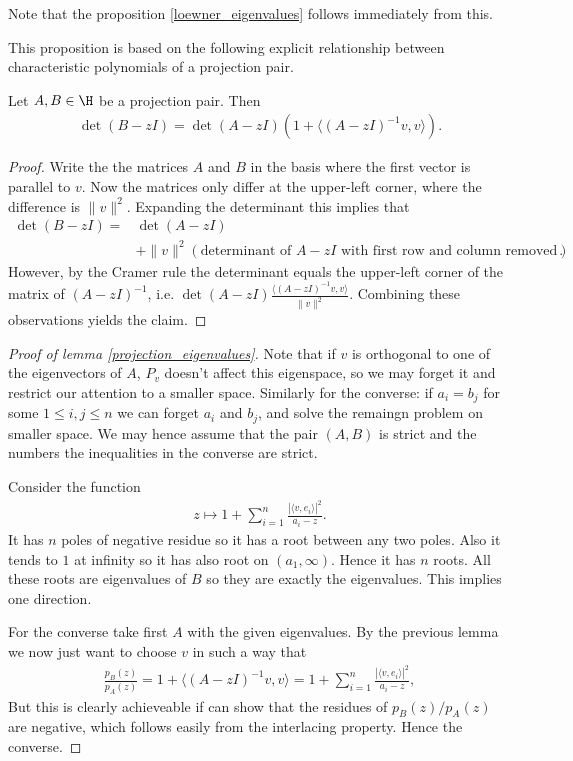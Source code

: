 Note that the proposition \ref{loewner_eigenvalues} follows immediately from this.

This proposition is based on the following explicit relationship between characteristic polynomials of a projection pair.

\begin{lem}\label{projection_characteristic_polynomial}
	Let $A, B \in \H$ be a projection pair. Then
	\begin{align*}
		\det(B - z I) = \det(A - z I) \left(1 + \langle (A - z I)^{-1}v, v\rangle\right).
	\end{align*}
\end{lem}
\begin{proof}
	Write the the matrices $A$ and $B$ in the basis where the first vector is parallel to $v$. Now the matrices only differ at the upper-left corner, where the difference is $\|v\|^2$. Expanding the determinant this implies that
	\begin{align*}
		\det(B - z I) =& \det(A - z I) \\
		&+ \|v\|^2 \left(\text{determinant of $A - zI$ with first row and column removed} \right).
	\end{align*}
	However, by the Cramer rule the determinant equals the upper-left corner of the matrix of $(A - z I)^{-1}$, i.e. $\det(A - z I)\frac{\langle (A - zI)^{-1} v, v \rangle}{\|v\|^2}$. Combining these observations yields the claim.
\end{proof}


\begin{proof}[Proof of lemma \ref{projection_eigenvalues}]
	Note that if $v$ is orthogonal to one of the eigenvectors of $A$, $P_{v}$ doesn't affect this eigenspace, so we may forget it and restrict our attention to a smaller space. Similarly for the converse: if $a_{i} = b_{j}$ for some $1 \leq i, j \leq n$ we can forget $a_{i}$ and $b_{j}$, and solve the remaingn problem on smaller space. We may hence assume that the pair $(A, B)$ is strict and the numbers the inequalities in the converse are strict.

	Consider the function
	\begin{align*}
		z \mapsto 1 + \sum_{i = 1}^{n} \frac{|\langle v, e_{i} \rangle|^2}{a_{i} - z}.
	\end{align*}
	It has $n$ poles of negative residue so it has a root between any two poles. Also it tends to $1$ at infinity so it has also root on $(a_{1}, \infty)$. Hence it has $n$ roots. All these roots are eigenvalues of $B$ so they are exactly the eigenvalues. This implies one direction.

	For the converse take first $A$ with the given eigenvalues. By the previous lemma we now just want to choose $v$ in such a way that
	\begin{align*}
		\frac{p_{B}(z)}{p_{A}(z)} = 1 + \langle (A - z I)^{-1}v, v\rangle= 1 + \sum_{i = 1}^{n} \frac{|\langle v, e_{i} \rangle|^2}{a_{i} - z},
	\end{align*}
	But this is clearly achieveable if can show that the residues of $p_{B}(z)/p_{A}(z)$ are negative, which follows easily from the interlacing property. Hence the converse.
\end{proof}

